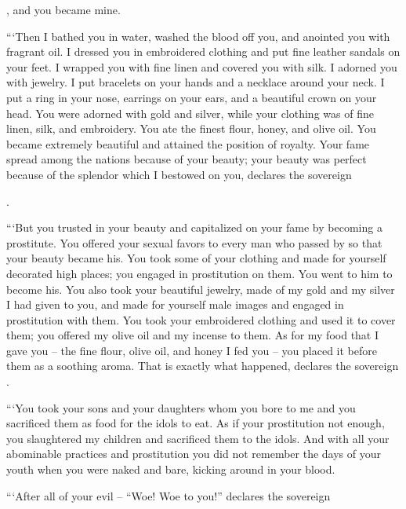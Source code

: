 {{}, and you became mine.
\par }{\PP {}“‘Then I bathed
you in water,
washed
the blood
off you, and anointed you with fragrant
oil.
I dressed
you in embroidered clothing
and put fine leather
sandals
on your feet. I wrapped
you with fine linen
and covered
you with silk.
I adorned
you with jewelry.
I put
bracelets
on
your hands
and a necklace around your neck.
I put
a ring
in
your nose,
earrings
on
your ears,
and a beautiful
crown
on your head.
You were adorned
with gold
and silver,
while your clothing
was of fine linen,
silk,
and embroidery.
You ate
the finest flour,
honey,
and olive oil.
You became extremely
beautiful
and attained the position
of royalty.
Your fame
spread among the nations
because
of your beauty; your beauty
was perfect
because
of the splendor
which
I bestowed
on
you, declares
the sovereign

{}.
\par }{\PP {}“‘But you trusted
in your beauty
and capitalized
on
your fame
by becoming a prostitute.
You offered your sexual favors
to
every
man who passed by so that your beauty became his.
You took
some of your clothing
and made
for yourself decorated
high places;
you engaged
in prostitution
on
them. You went
to him to become his.
You also took
your beautiful
jewelry,
made of my gold
and my silver
I had given
to you, and made
for yourself male
images
and engaged in prostitution with them.
You took
your embroidered
clothing
and used it to cover
them; you offered my olive oil
and my incense
to them.
As for my food
that
I gave you – the fine flour, olive oil, and honey I fed you – you placed it before them as a soothing aroma. That is exactly what happened, declares the sovereign
{}.
\par }{\PP {}“‘You took
your sons
and your daughters
whom
you bore
to me and you sacrificed
them as food for the idols to eat.
As if your prostitution
not enough,
you slaughtered
my children
and sacrificed them to the idols.
And with all
your abominable practices
and prostitution
you did not
remember
the days
of your youth
when
you were naked
and bare,
kicking around
in your blood.
\par }{\PP {}“‘After
all
of your evil
– “Woe! Woe
to you!” declares
the sovereign

}
